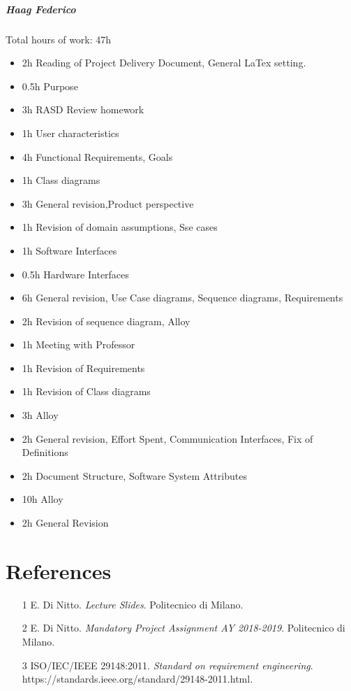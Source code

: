 \documentclass{report}
\newcommand{\ic}[1]{\textit{#1}}
\begin{document}
		\paragraph{Haag Federico} Total hours of work: 47h
			\begin{itemize}
				\item 2h Reading of Project Delivery Document, General LaTex setting.
				\item 0.5h Purpose
				\item 3h RASD Review homework
				\item 1h User characteristics
				\item 4h Functional Requirements, Goals
				\item 1h Class diagrams
				\item 3h General revision,Product perspective
				\item 1h Revision of domain assumptions, Sse cases
				\item 1h Software Interfaces
				\item 0.5h Hardware Interfaces
				\item 6h General revision, Use Case diagrams, Sequence diagrams, Requirements
				\item 2h Revision of sequence diagram, Alloy
				\item 1h Meeting with Professor
				\item 1h Revision of Requirements
				\item 1h Revision of Class diagrams
				\item 3h Alloy
				\item 2h General revision, Effort Spent, Communication Interfaces, Fix of Definitions
				\item 2h Document Structure, Software System Attributes
				\item 10h Alloy
				\item 2h General Revision
				
			\end{itemize}
	\chapter{References}
	\thispagestyle{fancy}
	\begin{itemize}
				\item[1]E. Di Nitto. \ic{Lecture Slides}. Politecnico di Milano.
				\item[2]E. Di Nitto. \ic{Mandatory Project Assignment AY 2018-2019}. Politecnico di Milano.
				\item[3]ISO/IEC/IEEE 29148:2011. \ic{Standard on requirement engineering}.\\https://standards.ieee.org/standard/29148-2011.html.
	\end{itemize}
	
\end{document}
